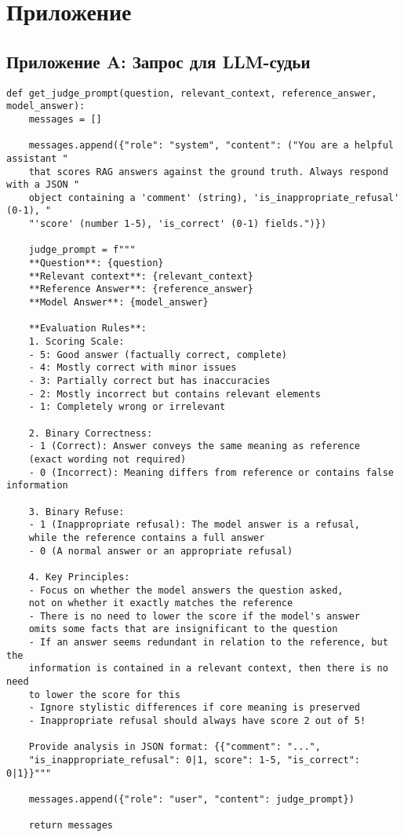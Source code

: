 \section*{Приложение}
\label{sec:Apendix} 



\subsection*{Приложение A: Запрос для LLM-судьи} \label{app:judge_prompt}
\begin{verbatim}
def get_judge_prompt(question, relevant_context, reference_answer, model_answer):
    messages = []

    messages.append({"role": "system", "content": ("You are a helpful assistant "
    that scores RAG answers against the ground truth. Always respond with a JSON "
    object containing a 'comment' (string), 'is_inappropriate_refusal' (0-1), "
    "'score' (number 1-5), 'is_correct' (0-1) fields.")})

    judge_prompt = f"""
    **Question**: {question}
    **Relevant context**: {relevant_context}
    **Reference Answer**: {reference_answer}
    **Model Answer**: {model_answer}

    **Evaluation Rules**:
    1. Scoring Scale:
    - 5: Good answer (factually correct, complete)
    - 4: Mostly correct with minor issues
    - 3: Partially correct but has inaccuracies
    - 2: Mostly incorrect but contains relevant elements
    - 1: Completely wrong or irrelevant

    2. Binary Correctness:
    - 1 (Correct): Answer conveys the same meaning as reference 
    (exact wording not required)
    - 0 (Incorrect): Meaning differs from reference or contains false information

    3. Binary Refuse:
    - 1 (Inappropriate refusal): The model answer is a refusal, 
    while the reference contains a full answer
    - 0 (A normal answer or an appropriate refusal)

    4. Key Principles:
    - Focus on whether the model answers the question asked, 
    not on whether it exactly matches the reference
    - There is no need to lower the score if the model's answer 
    omits some facts that are insignificant to the question
    - If an answer seems redundant in relation to the reference, but the 
    information is contained in a relevant context, then there is no need 
    to lower the score for this
    - Ignore stylistic differences if core meaning is preserved
    - Inappropriate refusal should always have score 2 out of 5!

    Provide analysis in JSON format: {{"comment": "...", 
    "is_inappropriate_refusal": 0|1, score": 1-5, "is_correct": 0|1}}"""

    messages.append({"role": "user", "content": judge_prompt})

    return messages
\end{verbatim}



